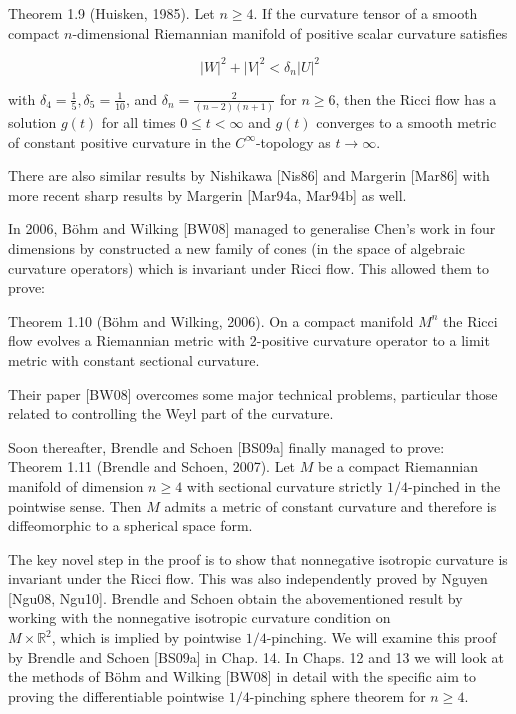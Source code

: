\documentclass[10pt, letterpaper]{article}
\begin{document}
Theorem 1.9 (Huisken, 1985). Let $n \geq 4$. If the curvature tensor of a smooth compact $n$-dimensional Riemannian manifold of positive scalar curvature satisfies

$$
|W|^{2}+|V|^{2}<\delta_{n}|U|^{2}
$$

with $\delta_{4}=\frac{1}{5}, \delta_{5}=\frac{1}{10}$, and $\delta_{n}=\frac{2}{(n-2)(n+1)}$ for $n \geq 6$, then the Ricci flow has a solution $g(t)$ for all times $0 \leq t<\infty$ and $g(t)$ converges to a smooth metric of constant positive curvature in the $C^{\infty}$-topology as $t \rightarrow \infty$.

There are also similar results by Nishikawa [Nis86] and Margerin [Mar86] with more recent sharp results by Margerin [Mar94a, Mar94b] as well.

In 2006, Böhm and Wilking [BW08] managed to generalise Chen's work in four dimensions by constructed a new family of cones (in the space of algebraic curvature operators) which is invariant under Ricci flow. This allowed them to prove:

Theorem 1.10 (Böhm and Wilking, 2006). On a compact manifold $M^{n}$ the Ricci flow evolves a Riemannian metric with 2-positive curvature operator to a limit metric with constant sectional curvature.

Their paper [BW08] overcomes some major technical problems, particular those related to controlling the Weyl part of the curvature.

Soon thereafter, Brendle and Schoen [BS09a] finally managed to prove:\\
Theorem 1.11 (Brendle and Schoen, 2007). Let $M$ be a compact Riemannian manifold of dimension $n \geq 4$ with sectional curvature strictly $1 / 4$-pinched in the pointwise sense. Then $M$ admits a metric of constant curvature and therefore is diffeomorphic to a spherical space form.

The key novel step in the proof is to show that nonnegative isotropic curvature is invariant under the Ricci flow. This was also independently proved by Nguyen [Ngu08, Ngu10]. Brendle and Schoen obtain the abovementioned result by working with the nonnegative isotropic curvature condition on\\
$M \times \mathbb{R}^{2}$, which is implied by pointwise $1 / 4$-pinching. We will examine this proof by Brendle and Schoen [BS09a] in Chap. 14. In Chaps. 12 and 13 we will look at the methods of Böhm and Wilking [BW08] in detail with the specific aim to proving the differentiable pointwise $1 / 4$-pinching sphere theorem for $n \geq 4$.
\end{document}
